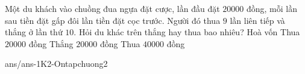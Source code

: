 \begin{ex}%
	Một du khách vào chuồng đua ngựa đặt cược, lần đầu đặt $20000$ đồng, mỗi lần sau tiền đặt gấp
	đôi lần tiền đặt cọc trước. Người đó thua $9$ lần liên tiếp và thắng ở lần thứ $10$. Hỏi du khác trên thắng hay thua bao nhiêu?
	\choice
	{Hoà vốn}
	{Thua $20000$ đồng}
	{\True Thắng $20000$ đồng}
	{Thua $40000$ đồng}
\end{ex}
\begin{indapan}{10}
	{ans/ans-1K2-Ontapchuong2}
\end{indapan}